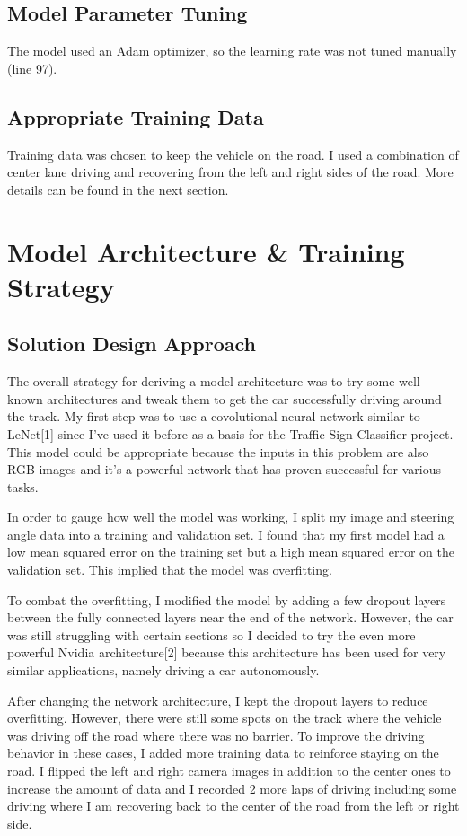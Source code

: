 \documentclass[12pt]{article}
\begin{document}
\subsection{Model Parameter Tuning}
The model used an Adam optimizer, so the learning rate was not tuned manually (line 97). 
\subsection{Appropriate Training Data}
Training data was chosen to keep the vehicle on the road. I used a combination of center lane driving and recovering from the left and right sides of the road. More details can be found in the next section.

\section{Model Architecture \& Training Strategy}
\subsection{Solution Design Approach}
The overall strategy for deriving a model architecture was to try some well-known architectures and tweak them to get the car successfully driving around the track. My first step was to use a covolutional neural network similar to LeNet[1] since I've used it before as a basis for the Traffic Sign Classifier project. This model could be appropriate because the inputs in this problem are also RGB images and it's a powerful network that has proven successful for various tasks.

In order to gauge how well the model was working, I split my image and steering angle data into a training and validation set. I found that my first model had a low mean squared error on the training set but a high mean squared error on the validation set. This implied that the model was overfitting.

To combat the overfitting, I modified the model by adding a few dropout layers between the fully connected layers near the end of the network. However, the car was still struggling with certain sections so I decided to try the even more powerful Nvidia architecture[2] because this architecture has been used for very similar applications, namely driving a car autonomously.

After changing the network architecture, I kept the dropout layers to reduce overfitting. However, there were still some spots on the track where the vehicle was driving off the road where there was no barrier. To improve the driving behavior in these cases, I added more training data to reinforce staying on the road. I flipped the left and right camera images in addition to the center ones to increase the amount of data and I recorded 2 more laps of driving including some driving where I am recovering back to the center of the road from the left or right side.
\end{document}
